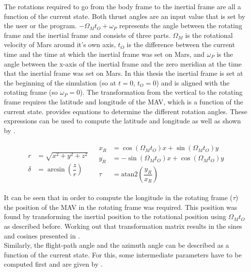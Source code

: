 The rotations required to go from the body frame to the inertial frame are all a function of the current state. Both thrust angles are an input value that is set by the user or the program. $-\Omega_{M}t_{O}+\omega_{P}$ represents the angle between the rotating frame and the inertial frame and consists of three parts. $\Omega_{M}$ is the rotational velocity of Mars around it's own axis, $t_{O}$ is the difference between the current time and the time at which the inertial frame was set on Mars, and $\omega_{P}$ is the angle between the x-axis of the inertial frame and the zero meridian at the time that the inertial frame was set on Mars. In this thesis the inertial frame is set at the beginning of the simulation (so at $t=0$, $t_{O}=0$) and is aligned with the rotating frame (so $\omega_{P}=0$). The transformation from the vertical to the rotating frame requires the latitude and longitude of the \ac{MAV}, which is a function of the current state. \cite{mooij1994motion} provides equations to determine the different rotation angles. These expressions can be used to compute the latitude and longitude as well as shown by .

\begin{align} \label{eq:latAndLong}
\begin{split} 
r&=\sqrt{x^{2}+y^{2}+z^{2}}\\
\delta&=\arcsin\left(\dfrac{z}{r}\right)
\end{split} 
&
\begin{split}
x_{R}&=\cos\left(\Omega_{M}t_{O}\right)x+\sin\left(\Omega_{M}t_{O}\right)y\\
y_{R}&=-\sin\left(\Omega_{M}t_{O}\right)x+\cos\left(\Omega_{M}t_{O}\right)y\\
\tau&=\text{atan2}\left(\dfrac{y_{R}}{x_{R}}\right)
\end{split}
\end{align}
 
It can be seen that in order to compute the longitude in the rotating frame ($\tau$) the position of the \ac{MAV} in the rotating frame was required. This position was found by transforming the inertial position to the rotational position using $\Omega_{M}t_{O}$ as described before. Working out that transformation matrix results in the sines and cosines presented in .\\

Similarly, the flight-path angle and the azimuth angle can be described as a function of the current state. For this, some intermediate parameters have to be computed first and are given by .

